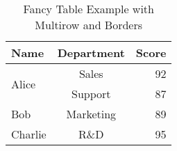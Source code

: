 \begin{table}[H]
    \centering
    \caption{Fancy Table Example with Multirow and Borders}
    \renewcommand{\arraystretch}{1.3}
    \begin{tabular}{|l|c|r|}
    \hline
    \rowcolor{gray!20}
    \textbf{Name} & \textbf{Department} & \textbf{Score} \\
    \hline
    \multirow{2}{*}{Alice} & Sales & 92 \\
     & Support & 87 \\
    \hline
    Bob & Marketing & 89 \\
    \hline
    Charlie & R\&D & 95 \\
    \hline
    \end{tabular}
    \end{table}
    